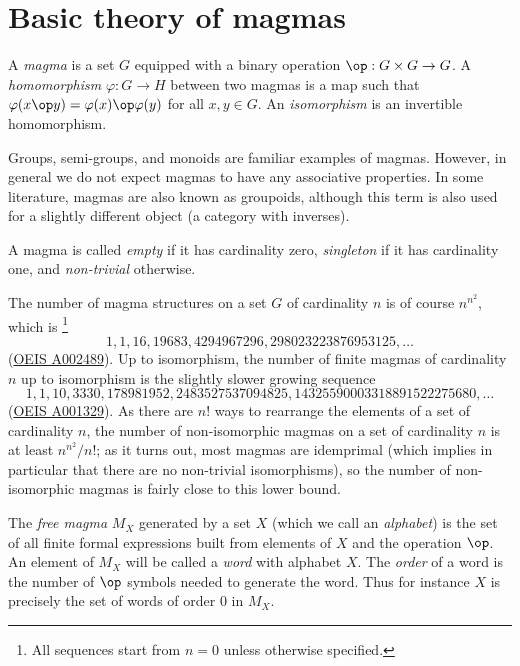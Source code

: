 \chapter{Basic theory of magmas}\label{basic-theory-chapter}
\begin{definition}[Magma]\label{magma-def}\leanok
  A \emph{magma} is a set $G$ equipped with a binary operation $\op: G \times G \to G$.
  A \emph{homomorphism} $\varphi : G \to H$ between two magmas is a map such that $\varphi(x \op y) = \varphi(x) \op \varphi(y)$ for all $x,y \in G$.
  An \emph{isomorphism} is an invertible homomorphism.
\end{definition}

Groups, semi-groups, and monoids are familiar examples of magmas. However, in general we do not expect magmas to have any associative properties. In some literature, magmas are also known as groupoids, although this term is also used for a slightly different object (a category with inverses).

A magma is called \emph{empty} if it has cardinality zero, \emph{singleton} if it has cardinality one, and \emph{non-trivial} otherwise.

The number of magma structures on a set $G$ of cardinality $n$ is of course $n^{n^2}$, which is \footnote{All sequences start from $n=0$ unless otherwise specified.}
$$ 1, 1, 16, 19683, 4294967296, 298023223876953125, \dots$$
(\href{https://oeis.org/A002489}{OEIS A002489}).
Up to isomorphism, the number of finite magmas of cardinality $n$ up to isomorphism is the slightly slower growing sequence
$$ 1, 1, 10, 3330, 178981952, 2483527537094825, 14325590003318891522275680, \dots$$
(\href{https://oeis.org/A001329}{OEIS A001329}).  As there are $n!$ ways to rearrange the elements of a set of cardinality $n$, the number of non-isomorphic magmas on a set of cardinality $n$ is at least $n^{n^2}/n!$; as it turns out, most magmas are idemprimal (which implies in particular that there are no non-trivial isomorphisms), so the number of non-isomorphic magmas is fairly close to this lower bound.

\begin{definition}\label{free-magma-def}\leanok{}
  The \emph{free magma} $M_X$ generated by a set $X$ (which we call an \emph{alphabet}) is the set of all finite formal expressions built from elements of $X$ and the operation $\op$.
  An element of $M_X$ will be called a \emph{word} with alphabet $X$.
  The \emph{order} of a word is the number of $\op$ symbols needed to generate the word.
  Thus for instance $X$ is precisely the set of words of order $0$ in $M_X$.
\end{definition}

